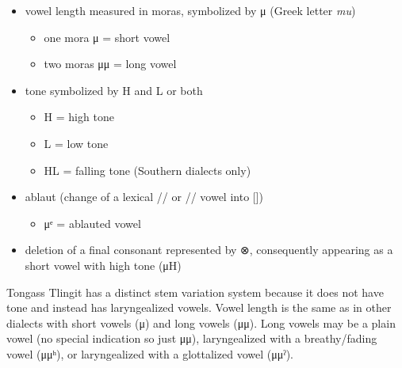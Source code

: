 \begin{itemize}
\item	vowel length measured in moras, symbolized by μ (Greek letter \textit{mu})
	\begin{itemize}
	\item	one mora μ = short vowel
	\item	two moras μμ = long vowel
	\end{itemize}
\item	tone symbolized by H and L or both
	\begin{itemize}
	\item	H = high tone
	\item	L = low tone
	\item	HL = falling tone (Southern dialects only)
	\end{itemize}
\item	ablaut (change of a lexical // or // vowel into [])
	\begin{itemize}
	\item	μᵉ = ablauted vowel
	\end{itemize}
\item	deletion of a final consonant represented by ⊗,
	consequently appearing as a short vowel with high tone (μH)
\end{itemize}

Tongass Tlingit has a distinct stem variation system because it does not have tone
and instead has laryngealized vowels.
Vowel length is the same as in other dialects with short vowels (μ) and long vowels (μμ).
Long vowels may be a plain vowel (no special indication so just μμ),
laryngealized with a breathy/fading vowel (μμʰ),
or laryngealized with a glottalized vowel (μμˀ).

